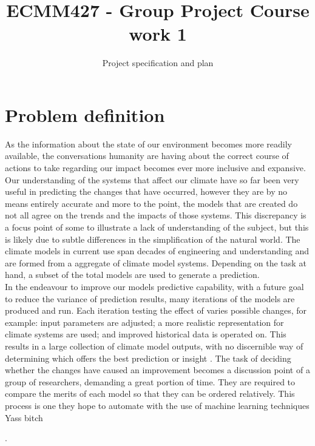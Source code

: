\documentclass[11pt]{article} %
\title{ECMM427 - Group Project Course work 1}
\author{Project specification and plan}
\numberwithin{equation}{section}
\renewcommand{\indent}{\hspace*{15pt}\ignorespaces}
\begin{document}
\pagestyle{empty}
\tableofcontents
\clearpage
\pagestyle{fancy}
\setcounter{page}{1}
\maketitle

\section{Problem definition}

As the information about the state of our environment becomes more readily available, the conversations humanity are having about the correct course of actions to take regarding our impact becomes ever more inclusive and expansive. Our understanding of the systems that affect our climate have so far been very useful in predicting the changes that have occurred, however they are by no means entirely accurate and more to the point, the models that are created do not all agree on the trends and the impacts of those systems. This discrepancy is a focus point of some to illustrate a lack of understanding of the subject, but this is likely due to subtle differences in the simplification of the natural world. The climate models in current use span decades of engineering and understanding and are formed from a aggregate of climate model systems. Depending on the task at hand, a subset of the total models are used to generate a prediction.\\

\indent In the endeavour to improve our models predictive capability, with a future goal to reduce the variance of prediction results, many iterations of the models are produced and run. Each iteration testing the effect of varies possible changes, for example: input parameters are adjusted; a more realistic representation for climate systems are used; and improved historical data is operated on. This results in a large collection of climate model outputs, with no discernible way of determining which offers the best prediction or insight . The task of deciding whether the changes have caused an improvement becomes a discussion point of a group of researchers, demanding a great portion of time. They are required to compare the merits of each model so that they can be ordered relatively. This process is one they hope to automate with the use of machine learning techniques\\


Yass bitch

.\\
\end{document}
